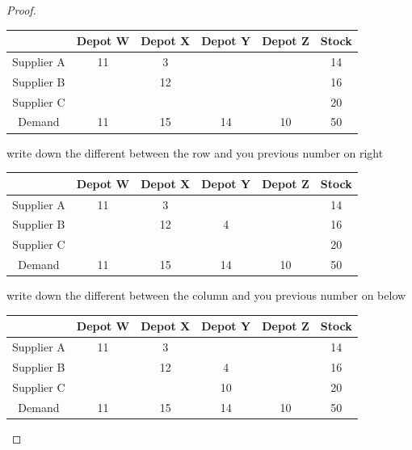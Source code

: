 \documentclass[a4paper]{article}
\begin{document}
\begin{eg}
\begin{proof}
		\begin{center}
			\begin{tabular}{|c|c|c|c|c|c|}
				\hline
				           & Depot W & Depot X & Depot Y & Depot Z & Stock \\
				\hline
				Supplier A & 11      & 3       &         &         & 14    \\
				\hline
				Supplier B &         & 12      &         &         & 16    \\
				\hline
				Supplier C &         &         &         &         & 20    \\
				\hline
				Demand     & 11      & 15      & 14      & 10      & 50    \\
				\hline
			\end{tabular}
		\end{center}
		write down the different between the row and you previous number on right
		\begin{center}
			\begin{tabular}{|c|c|c|c|c|c|}
				\hline
				           & Depot W & Depot X & Depot Y & Depot Z & Stock \\
				\hline
				Supplier A & 11      & 3       &         &         & 14    \\
				\hline
				Supplier B &         & 12      & 4       &         & 16    \\
				\hline
				Supplier C &         &         &         &         & 20    \\
				\hline
				Demand     & 11      & 15      & 14      & 10      & 50    \\
				\hline
			\end{tabular}
		\end{center}
		write down the different between the column and you previous number on below
		\begin{center}
			\begin{tabular}{|c|c|c|c|c|c|}
				\hline
				           & Depot W & Depot X & Depot Y & Depot Z & Stock \\
				\hline
				Supplier A & 11      & 3       &         &         & 14    \\
				\hline
				Supplier B &         & 12      & 4       &         & 16    \\
				\hline
				Supplier C &         &         & 10      &         & 20    \\
				\hline
				Demand     & 11      & 15      & 14      & 10      & 50    \\
				\hline
			\end{tabular}

\end{center}
\end{proof}
\end{eg}
\end{document}
